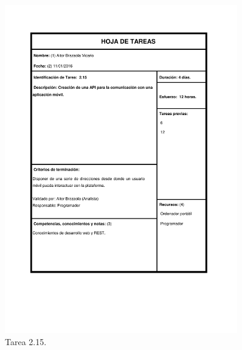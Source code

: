 \documentclass{DeustoFDP}
\begin{document}
\begin{figure}[H]
	\centering
	\includegraphics[width=0.9\textwidth]{fig/Tareas/215}
	\caption{Tarea 2.15.}
	\label{fig:t215}
\end{figure}
\end{document}
